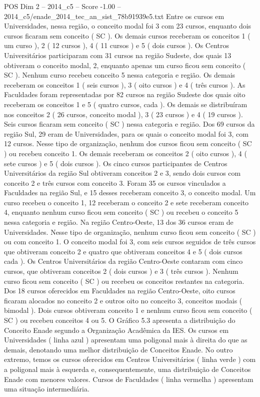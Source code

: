 \begin{textsample}{POS Dim 2 – 2014\_c5 – Score -1.00 – 2014\_c5/enade\_2014\_tec\_an\_sist\_78b91939e5.txt}
Entre os cursos em Universidades, nessa região, o conceito modal foi 3 com 23 cursos, enquanto dois cursos ficaram sem conceito ( SC ).
Os demais cursos receberam os conceitos 1 ( um curso ), 2 ( 12 cursos ), 4 ( 11 cursos ) e 5 ( dois cursos ).
Os Centros Universitários participaram com 31 cursos na região Sudeste, dos quais 13 obtiveram o conceito modal, 2, enquanto apenas um curso ficou sem conceito ( SC ).
Nenhum curso recebeu conceito 5 nessa categoria e região.
Os demais receberam os conceitos 1 ( seis cursos ), 3 ( oito cursos ) e 4 ( três cursos ).
As Faculdades foram representadas por 82 cursos na região Sudeste dos quais oito receberam os conceitos 1 e 5 ( quatro cursos, cada ).
Os demais se distribuíram nos conceitos 2 ( 26 cursos, conceito modal ), 3 ( 23 cursos ) e 4 ( 19 cursos ).
Seis cursos ficaram sem conceito ( SC ) nessa categoria e região.
Dos 69 cursos da região Sul, 29 eram de Universidades, para os quais o conceito modal foi 3, com 12 cursos.
Nesse tipo de organização, nenhum dos cursos ficou sem conceito ( SC ) ou recebeu conceito 1.
Os demais receberam os conceitos 2 ( oito cursos ), 4 ( sete cursos ) e 5 ( dois cursos ).
Os cinco cursos participantes de Centros Universitários da região Sul obtiveram conceitos 2 e 3, sendo dois cursos com conceito 2 e três cursos com conceito 3.
Foram 35 os cursos vinculados a Faculdades na região Sul, e 15 desses receberam conceito 3, o conceito modal.
Um curso recebeu o conceito 1, 12 receberam o conceito 2 e sete receberam conceito 4, enquanto nenhum curso ficou sem conceito ( SC ) ou recebeu o conceito 5 nessa categoria e região.
Na região Centro-Oeste, 13 dos 36 cursos eram de Universidades.
Nesse tipo de organização, nenhum curso ficou sem conceito ( SC ) ou com conceito 1.
O conceito modal foi 3, com seis cursos seguidos de três cursos que obtiveram conceito 2 e quatro que obtiveram conceitos 4 e 5 ( dois cursos cada ).
Os Centros Universitários da região Centro-Oeste contaram com cinco cursos, que obtiveram conceitos 2 ( dois cursos ) e 3 ( três cursos ).
Nenhum curso ficou sem conceito ( SC ) ou recebeu os conceitos restantes na categoria.
Dos 18 cursos oferecidos em Faculdades na região Centro-Oeste, oito cursos ficaram alocados no conceito 2 e outros oito no conceito 3, conceitos modais ( bimodal ).
Dois cursos obtiveram conceito 1 e nenhum curso ficou sem conceito ( SC ) ou recebeu conceitos 4 ou 5.
O Gráfico 5.3 apresenta a distribuição do Conceito Enade segundo a Organização Acadêmica da IES.
Os cursos em Universidades ( linha azul ) apresentam uma poligonal mais à direita do que as demais, denotando uma melhor distribuição de Conceitos Enade.
No outro extremo, temos os cursos oferecidos em Centros Universitários ( linha verde ) com a poligonal mais à esquerda e, consequentemente, uma distribuição de Conceitos Enade com menores valores.
Cursos de Faculdades ( linha vermelha ) apresentam uma situação intermediária.

\end{textsample}
